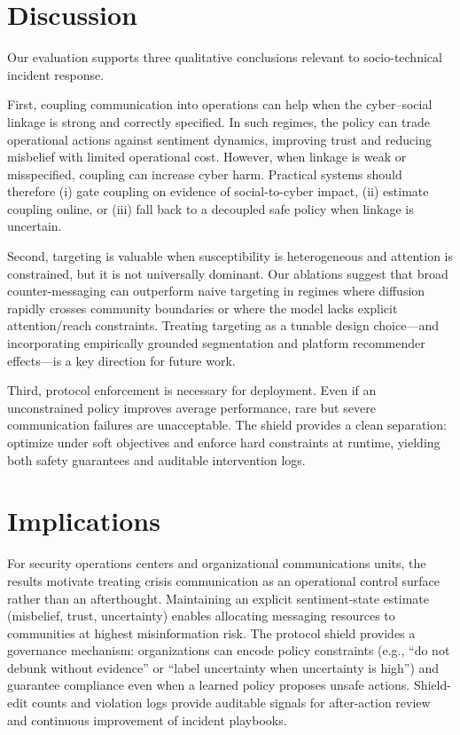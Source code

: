 \documentclass[referee,lineno,sn-basic]{sn-jnl}
\begin{document}
\section{Discussion}
Our evaluation supports three qualitative conclusions relevant to socio-technical incident response.

First, coupling communication into operations can help when the cyber--social linkage is strong and correctly specified. In such regimes, the policy can trade operational actions against sentiment dynamics, improving trust and reducing misbelief with limited operational cost. However, when linkage is weak or misspecified, coupling can increase cyber harm. Practical systems should therefore (i) gate coupling on evidence of social-to-cyber impact, (ii) estimate coupling online, or (iii) fall back to a decoupled safe policy when linkage is uncertain.

Second, targeting is valuable when susceptibility is heterogeneous and attention is constrained, but it is not universally dominant. Our ablations suggest that broad counter-messaging can outperform naive targeting in regimes where diffusion rapidly crosses community boundaries or where the model lacks explicit attention/reach constraints. Treating targeting as a tunable design choice---and incorporating empirically grounded segmentation and platform recommender effects---is a key direction for future work.

Third, protocol enforcement is necessary for deployment. Even if an unconstrained policy improves average performance, rare but severe communication failures are unacceptable. The shield provides a clean separation: optimize under soft objectives and enforce hard constraints at runtime, yielding both safety guarantees and auditable intervention logs.

\section{Implications}
For security operations centers and organizational communications units, the results motivate treating crisis communication as an operational control surface rather than an afterthought. Maintaining an explicit sentiment-state estimate (misbelief, trust, uncertainty) enables allocating messaging resources to communities at highest misinformation risk. The protocol shield provides a governance mechanism: organizations can encode policy constraints (e.g., ``do not debunk without evidence'' or ``label uncertainty when uncertainty is high'') and guarantee compliance even when a learned policy proposes unsafe actions. Shield-edit counts and violation logs provide auditable signals for after-action review and continuous improvement of incident playbooks.
\end{document}
